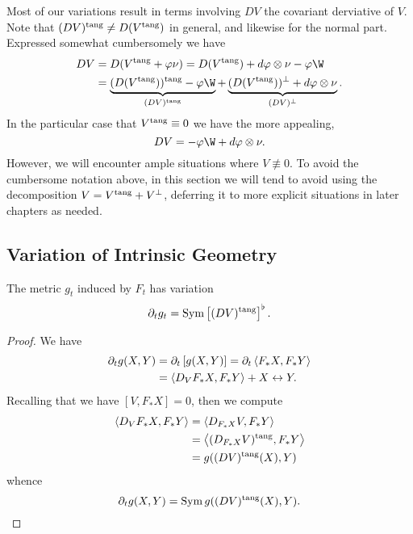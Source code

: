 \begin{rem}
Most of our variations result in terms involving \(DV\) the covariant derviative of \(V\). Note that \((DV)^{\operatorname{tang}} \ne D(V^{\operatorname{tang}})\) in general, and likewise for the normal part. Expressed somewhat cumbersomely we have
\[
\begin{split}
DV &= D(V^{\tang} + \varphi \nu) = D(V^{\tang}) + d\varphi \otimes \nu - \varphi\W \\
&= \underbrace{(D(V^{\tang}))^{\tang} - \varphi\W}_{(DV)^{\tang}} + \underbrace{(D(V^{\tang}))^{\perp} + d\varphi \otimes \nu}_{(DV)^{\perp}}.
\end{split}
\]
In the particular case that \(V^{\operatorname{tang}} \equiv 0\) we have the more appealing,
\[
DV = -\varphi\W + d\varphi \otimes \nu.
\]
However, we will encounter ample situations where \(V \not\equiv 0\). To avoid the cumbersome notation above, in this section we will tend to avoid using the decomposition \(V = V^{\operatorname{tang}} + V^{\perp}\), deferring it to more explicit situations in later chapters as needed.
\end{rem}

\subsection*{Variation of Intrinsic Geometry}

\begin{lemma}
\label{lem:dt_g}
The metric \(g_t\) induced by \(F_t\) has variation
\[
\partial_t g_t = \operatorname{Sym} \left[(DV)^{\operatorname{tang}}\right]^{\flat}.
\]
\end{lemma}

\begin{proof}
We have
\[
\begin{split}
\partial_t g (X, Y) &= \partial_t \left[g(X, Y)\right] = \partial_t \left\langle F_{\ast} X,F_{\ast} Y \right\rangle \\
&= \left\langle D_V F_{\ast} X,F_{\ast} Y \right\rangle + X \leftrightarrow Y.
\end{split}
\]
Recalling that we have \([V, F_{\ast} X] = 0\), then we compute
\[
\begin{split}
\left\langle D_V F_{\ast} X,F_{\ast} Y \right\rangle &= \left\langle D_{F_{\ast} X} V,F_{\ast} Y \right\rangle \\
&= \left\langle (D_{F_{\ast} X} V)^{\operatorname{tang}},F_{\ast} Y \right\rangle \\
&= g((DV)^{\operatorname{tang}} (X), Y)
\end{split}
\]
whence
\[
\partial_t g (X, Y) = \operatorname{Sym} g((DV)^{\operatorname{tang}} (X), Y).
\]
\end{proof}

